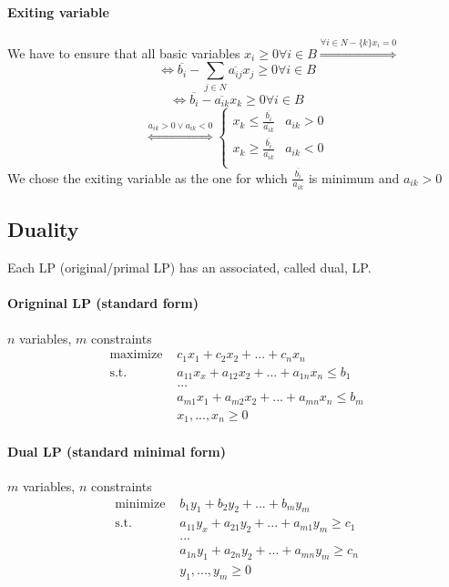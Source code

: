 \paragraph{Exiting variable} We have to ensure that all basic variables $x_i \geq 0 \forall i \in B \stackrel{\forall i \in N  -\{k\} x_i = 0}{\Longrightarrow}$ \\
$$\Leftrightarrow \overline{b_i} - \sum_{j \in N}\overline{a_{ij}}x_j \geq 0 \forall i \in B$$ 
$$\Leftrightarrow \overline{b_i} - \overline{a_{ik}}x_k \geq 0 \forall i \in B$$ 
$$\stackrel{a_{ik}>0 \lor a_{ik}<0}{\Longleftrightarrow} \begin{cases}
x_k \leq \frac{\overline{b_i}}{\overline{a_{ik}}} & a_{ik} > 0 \\
x_k \geq \frac{\overline{b_i}}{\overline{a_{ik}}} & a_{ik} < 0\\
\end{cases}$$
We chose the exiting variable as the one for which $\frac{\overline{b_i}}{a_{ik}}$ is minimum and $a_{ik} > 0$ \\

\subsection{Duality}
Each LP (original/primal LP) has an associated, called dual, LP.
\paragraph{Origninal LP (standard form)} $n$ variables, $m$ constraints \\
\begin{align*}
\text{maximize } & c_1x_1+c_2x_2+...+c_nx_n \\
\text{s.t. } &a_{11}x_x+a_{12}x_2+...+a_{1n}x_n \leq b_1 \\
&... \\
&a_{m1}x_1+a_{m2}x_2+...+a_{mn}x_n \leq b_m \\
&x_1,...,x_n \geq 0
\end{align*}
\paragraph{Dual LP (standard minimal form)} $m$ variables, $n$ constraints \\
\begin{align*}
\text{minimize } & b_1y_1+b_2y_2+...+b_my_m \\
\text{s.t. } &a_{11}y_x+a_{21}y_2+...+a_{m1}y_m \geq c_1 \\
&... \\
&a_{1n}y_1+a_{2n}y_2+...+a_{mn}y_m \geq c_n\\
&y_1,...,y_m \geq 0
\end{align*}
